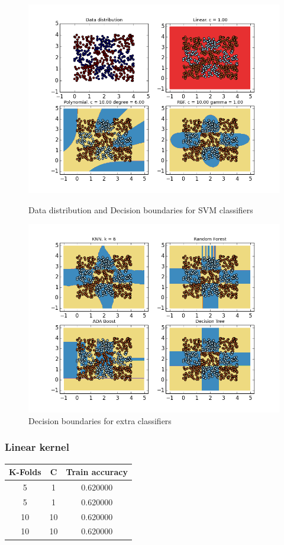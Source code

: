\documentclass{article}
\begin{document}
\begin{figure}[p]
\centering
\includegraphics[width=\textwidth]{main_classifiers}
\caption{Data distribution and Decision boundaries for SVM classifiers}
\includegraphics[width=\textwidth]{extra_classifiers}
\caption{Decision boundaries for extra classifiers}
\label{main_classifiers}
\end{figure}

\subsubsection{Linear kernel}

\begin{table}[htb]
\begin{tabular}{|c|c|c|}
\hline
\textbf{K-Folds} & \textbf{C}  & \textbf{Train accuracy}    \\ \hline
\rowcolor[HTML]{34FF34} 
5       & 1  & 0.620000 \\ \hline
5       & 1  & 0.620000 \\ \hline
10      & 10 & 0.620000 \\ \hline
10      & 10 & 0.620000 \\ \hline
\end{tabular}
\end{table}
\end{document}
